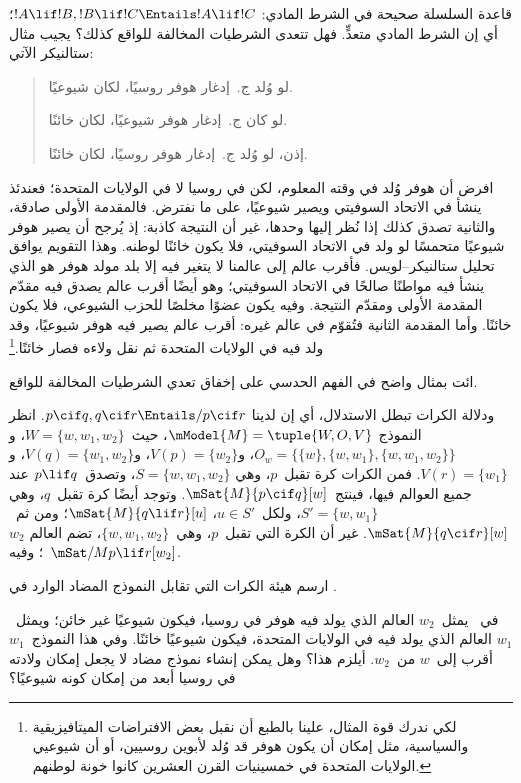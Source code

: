 \documentclass[../../../include/open-logic-section]{subfiles}
\begin{document}


قاعدة السلسلة صحيحة في الشرط المادي:
$!A \lif !B, !B \lif !C \Entails !A \lif !C$؛ أي إن الشرط المادي
متعدٍّ. فهل تتعدى الشرطيات المخالفة للواقع كذلك؟ يجيب مثال ستالنيكر
الآتي:
\begin{quote}
  لو وُلد ج.~إدغار هوفر روسيًا، لكان شيوعيًا.

  لو كان ج.~إدغار هوفر شيوعيًا، لكان خائنًا.

  إذن، لو وُلد ج.~إدغار هوفر روسيًا، لكان خائنًا.
\end{quote}
افرض أن هوفر وُلد في وقته المعلوم، لكن في روسيا لا في الولايات المتحدة؛
فعندئذ ينشأ في الاتحاد السوفيتي ويصير شيوعيًا، على ما نفترض. فالمقدمة
الأولى صادقة، والثانية تصدق كذلك إذا نُظر إليها وحدها، غير أن النتيجة
كاذبة: إذ يُرجح أن يصير هوفر شيوعيًا متحمسًا لو ولد في الاتحاد
السوفيتي، فلا يكون خائنًا لوطنه. وهذا التقويم يوافق تحليل
ستالنيكر--لويس. فأقرب عالم إلى عالمنا لا يتغير فيه إلا بلد مولد هوفر
هو الذي ينشأ فيه مواطنًا صالحًا في الاتحاد السوفيتي؛ وهو أيضًا أقرب
عالم يصدق فيه مقدّم المقدمة الأولى ومقدّم النتيجة. وفيه يكون عضوًا
مخلصًا للحزب الشيوعي، فلا يكون خائنًا. وأما المقدمة الثانية فتُقوّم في
عالم غيره: أقرب عالم يصير فيه هوفر شيوعيًا، وقد ولد فيه في الولايات
المتحدة ثم نقل ولاءه فصار خائنًا.\footnote{لكي ندرك قوة المثال، علينا بالطبع أن نقبل بعض
  الافتراضات الميتافيزيقية والسياسية، مثل إمكان أن يكون هوفر قد وُلد
  لأبوين روسيين، أو أن شيوعيي الولايات المتحدة في خمسينيات القرن
  العشرين كانوا خونة لوطنهم.}

\begin{prob}
  ائت بمثال واضح في الفهم الحدسي على إخفاق تعدي الشرطيات المخالفة للواقع.
\end{prob}

\begin{ex}
  ودلالة الكرات تبطل الاستدلال، أي إن لدينا
  $p \cif q, q \cif r \Entails/ p \cif r$. انظر النموذج
  $\mModel{M} = \tuple{W, O, V}$، حيث~$W = \{w, w_1, w_2\}$،
  و$O_w = \{\{w\}, \{w, w_1\}, \{w, w_1, w_2\}\}$،
  و$V(p) = \{w_2\}$، و$V(q) = \{w_1, w_2\}$،
  و$V(r) = \{w_1\}$. فمن الكرات كرة تقبل~$p$، وهي
  $S = \{w, w_1, w_2\}$، وتصدق~$p \lif q$ عند جميع العوالم فيها،
  فينتج~$\mSat{M}{p \cif q}[w]$. وتوجد أيضًا كرة تقبل~$q$، وهي
  $S' = \{w, w_1\}$، ولكل~$u \in S'$،
  $\mSat{M}{q \lif r}[u]$؛ ومن ثم~$\mSat{M}{q \cif r}[w]$.
  غير أن الكرة التي تقبل~$p$، وهي~$\{w, w_1, w_2\}$، تضم العالم
  $w_2$؛ وفيه~$\mSat/{M}{p \lif r}[w_2]$.
\end{ex}

\begin{prob}
ارسم هيئة الكرات التي تقابل النموذج المضاد الوارد في
.
\end{prob}

\begin{prob}
  في~ يمثل~$w_2$ العالم الذي
  يولد فيه هوفر في روسيا، فيكون شيوعيًا غير خائن؛ ويمثل~$w_1$ العالم
  الذي يولد فيه في الولايات المتحدة، فيكون شيوعيًا خائنًا. وفي هذا
  النموذج~$w_1$ أقرب إلى~$w$ من~$w_2$. أيلزم هذا؟ وهل يمكن إنشاء
  نموذج مضاد لا يجعل إمكان ولادته في روسيا أبعد من إمكان كونه شيوعيًا؟
\end{prob}
\end{document}
